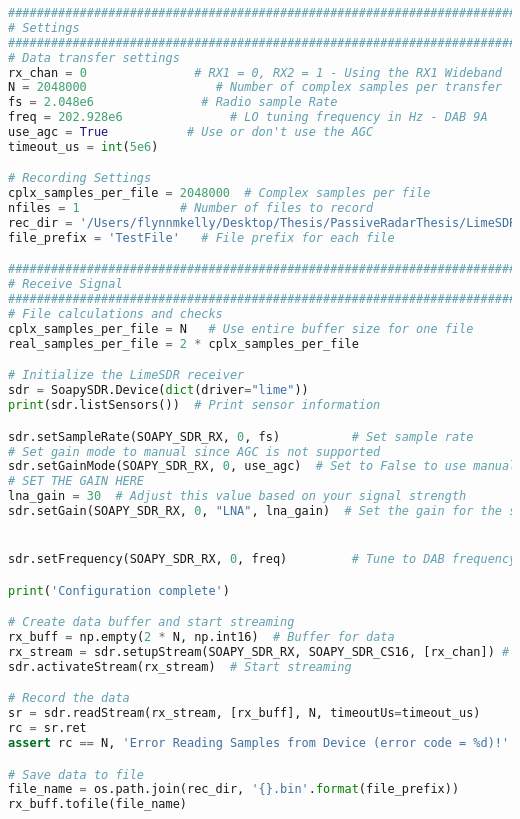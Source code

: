 \begin{appendices}
\begin{lstlisting}[language=Python, caption={Python code for capturing DAB signal using LimeSDR}, label={lst:limeSDR_code}]
########################################################################################
# Settings
########################################################################################
# Data transfer settings
rx_chan = 0               # RX1 = 0, RX2 = 1 - Using the RX1 Wideband
N = 2048000                  # Number of complex samples per transfer
fs = 2.048e6               # Radio sample Rate
freq = 202.928e6               # LO tuning frequency in Hz - DAB 9A
use_agc = True           # Use or don't use the AGC
timeout_us = int(5e6)

# Recording Settings
cplx_samples_per_file = 2048000  # Complex samples per file
nfiles = 1              # Number of files to record
rec_dir = '/Users/flynnmkelly/Desktop/Thesis/PassiveRadarThesis/LimeSDR'  # Location of drive for recording
file_prefix = 'TestFile'   # File prefix for each file

########################################################################################
# Receive Signal
########################################################################################
# File calculations and checks
cplx_samples_per_file = N   # Use entire buffer size for one file
real_samples_per_file = 2 * cplx_samples_per_file

# Initialize the LimeSDR receiver
sdr = SoapySDR.Device(dict(driver="lime"))
print(sdr.listSensors())  # Print sensor information

sdr.setSampleRate(SOAPY_SDR_RX, 0, fs)          # Set sample rate
# Set gain mode to manual since AGC is not supported
sdr.setGainMode(SOAPY_SDR_RX, 0, use_agc)  # Set to False to use manual gain
# SET THE GAIN HERE
lna_gain = 30  # Adjust this value based on your signal strength
sdr.setGain(SOAPY_SDR_RX, 0, "LNA", lna_gain)  # Set the gain for the selected channel


sdr.setFrequency(SOAPY_SDR_RX, 0, freq)         # Tune to DAB frequency

print('Configuration complete')

# Create data buffer and start streaming
rx_buff = np.empty(2 * N, np.int16)  # Buffer for data
rx_stream = sdr.setupStream(SOAPY_SDR_RX, SOAPY_SDR_CS16, [rx_chan]) # Setup data stream
sdr.activateStream(rx_stream)  # Start streaming

# Record the data
sr = sdr.readStream(rx_stream, [rx_buff], N, timeoutUs=timeout_us)
rc = sr.ret
assert rc == N, 'Error Reading Samples from Device (error code = %d)!' % rc

# Save data to file
file_name = os.path.join(rec_dir, '{}.bin'.format(file_prefix))
rx_buff.tofile(file_name)


\end{lstlisting}
\end{appendices}
